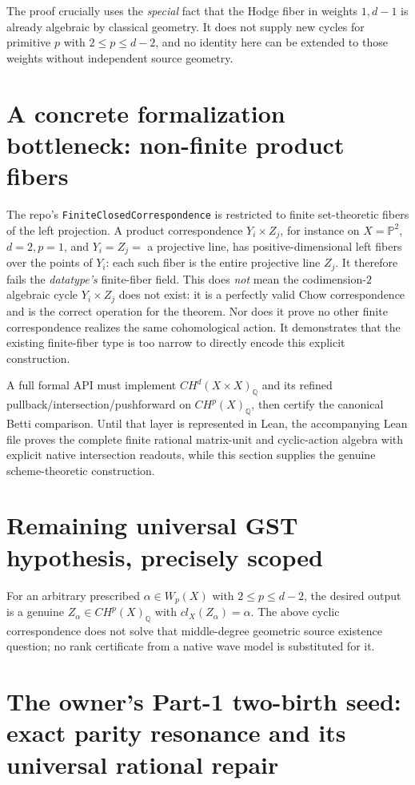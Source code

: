 \documentclass[11pt]{article}
\begin{document}
The proof crucially uses the \emph{special} fact that the Hodge fiber
in weights $1,d-1$ is already algebraic by classical geometry.
It does not supply new cycles for primitive $p$ with
$2\le p\le d-2$, and no identity here can be extended to those
weights without independent source geometry.

\section{A concrete formalization bottleneck: non-finite product fibers}
The repo's
\texttt{FiniteClosedCorrespondence} is restricted to finite
set-theoretic fibers of the left projection.
A product correspondence $Y_i\times Z_j$, for instance on
$X=\mathbb P^2$, $d=2,p=1$, and $Y_i=Z_j=$ a projective line,
has positive-dimensional left fibers over the points of $Y_i$:
each such fiber is the entire projective line $Z_j$.
It therefore fails the \emph{datatype's} finite-fiber field.
This does \emph{not} mean the codimension-$2$ algebraic cycle
$Y_i\times Z_j$ does not exist: it is a perfectly valid Chow
correspondence and is the correct operation for the theorem.
Nor does it prove no other finite correspondence realizes the
same cohomological action. It demonstrates that the existing
finite-fiber type is too narrow to directly encode this
explicit construction.

A full formal API must implement $CH^d(X\times X)_{\mathbb Q}$
and its refined pullback/intersection/pushforward on
$CH^p(X)_{\mathbb Q}$, then certify the canonical Betti
comparison. Until that layer is represented in Lean, the
accompanying Lean file proves the complete finite rational
matrix-unit and cyclic-action algebra with explicit native
intersection readouts, while this section supplies the genuine
scheme-theoretic construction.

\section{Remaining universal GST hypothesis, precisely scoped}
For an arbitrary prescribed
$\alpha\in W_p(X)$ with $2\le p\le d-2$,
the desired output is a genuine $Z_\alpha\in CH^p(X)_{\mathbb Q}$
with $cl_X(Z_\alpha)=\alpha$.
The above cyclic correspondence does not solve that middle-degree
geometric source existence question; no rank certificate from a
native wave model is substituted for it.

\section{The owner's Part-1 two-birth seed: exact parity resonance and its universal rational repair}
\end{document}

